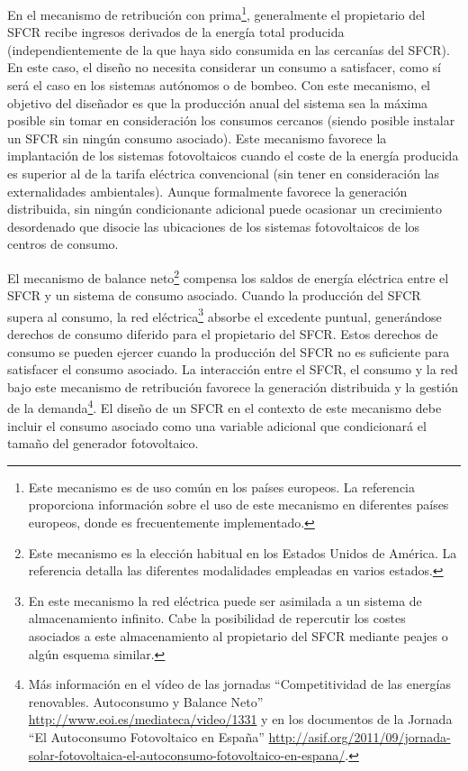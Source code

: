 En el mecanismo de retribución con prima\footnote{Este
mecanismo es de uso común en los países europeos. La referencia
\cite{Collado2009} proporciona información sobre el uso de este
mecanismo en diferentes países europeos, donde es frecuentemente
implementado.}, generalmente el propietario
del SFCR recibe ingresos derivados de la energía total producida
(independientemente de la que haya sido consumida en las cercanías del
SFCR). En este caso, el diseño no necesita considerar un consumo a
satisfacer, como sí será el caso en los sistemas autónomos o de
bombeo. Con este mecanismo, el objetivo del diseñador es que la
producción anual del sistema sea la máxima posible sin tomar en
consideración los consumos cercanos (siendo posible instalar un SFCR
sin ningún consumo asociado). Este mecanismo favorece la implantación
de los sistemas fotovoltaicos cuando el coste de la energía producida
es superior al de la tarifa eléctrica convencional (sin tener en
consideración las externalidades ambientales). Aunque formalmente
favorece la generación distribuida, sin ningún condicionante adicional
puede ocasionar un crecimiento desordenado que disocie las ubicaciones
de los sistemas fotovoltaicos de los centros de consumo. 

El mecanismo de balance neto\footnote{Este mecanismo es la elección
habitual en los Estados Unidos de América. La referencia \cite{Chapman.Rose2011}
detalla las diferentes modalidades empleadas en varios estados.} compensa los saldos de energía eléctrica
entre el SFCR y un sistema de consumo asociado. Cuando la producción
del SFCR supera al consumo, la red eléctrica\footnote{En este
  mecanismo la red eléctrica puede ser asimilada a un sistema de
  almacenamiento infinito. Cabe la posibilidad de repercutir los
  costes asociados a este almacenamiento al propietario del SFCR
  mediante peajes o algún esquema similar.} absorbe el excedente
puntual, generándose derechos de consumo diferido para el propietario
del SFCR. Estos derechos de consumo se pueden ejercer cuando la
producción del SFCR no es suficiente para satisfacer el consumo
asociado. La interacción entre el SFCR, el consumo y la red bajo este
mecanismo de retribución favorece la generación distribuida y la
gestión de la demanda\footnote{Más información en el vídeo de las
  jornadas ``Competitividad de las energías renovables. Autoconsumo y
  Balance Neto'' \url{http://www.eoi.es/mediateca/video/1331} y en los
  documentos de la Jornada ``El Autoconsumo Fotovoltaico en España''
  \url{http://asif.org/2011/09/jornada-solar-fotovoltaica-el-autoconsumo-fotovoltaico-en-espana/}.}.
El diseño de un SFCR en el contexto de este mecanismo debe incluir el
consumo asociado como una variable adicional que condicionará el
tamaño del generador fotovoltaico. 

